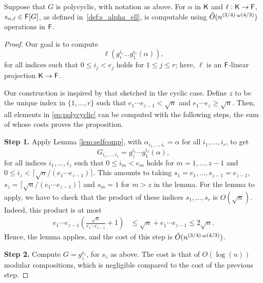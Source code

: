\begin{proposition}\label{prop:polycyclic}
  Suppose that $G$ is polycyclic, with notation as above. For $\alpha$ in
  ${\mathsf{K}}$ and $\ell:{\mathsf{K}}\to{\mathsf{F}}$, $s_{\alpha,\ell} \in {\mathsf{F}}[G]$, as defined
  in~\eqref{def:s_alpha_ell}, is computable using $\tilde{O}(n^{(3/4)\cdot \omega(4/3)})$
  operations in ${\mathsf{F}}$.
\end{proposition}
\begin{proof}
Our goal is to compute
\begin{equation} \label{eq:polycyclic}
  \ell (g_r^{i_r}  \ldots g_1^{i_1}(\alpha)),
\end{equation}
for all indices such that $0 \leq i_j < e_j$ holds for $1 \leq j \leq
r$; here, $\ell$ is an ${\mathsf{F}}$-linear projection ${\mathsf{K}}\to {\mathsf{F}}$.

Our construction is inspired by that sketched in the cyclic case.
Define $z$ to be the unique index in $\{1,\dots,r\}$ such that
$e_1\cdots e_{z-1} < \sqrt{n}$ and $e_1 \cdots e_{z} \geq
\sqrt{n}.$ Then, all elements in \eqref{eq:polycyclic} can be computed
with the following steps, the sum of whose costs proves the
proposition.

\smallskip\noindent \textbf{Step 1.} Apply Lemma \ref{lem:selfcomp},
with $\alpha_{i_1,\dots,i_r} = \alpha$ for all $i_1,\dots,i_r$, to get
$$ G_{i_z,\dots,i_1}=g_z^{i_z} \cdots
g_1^{i_1}(\alpha),$$ for all indices $i_1,\dots,i_z$ such that $0\leq
i_m < e_m$ holds for $m=1,\dots,z-1$ and $0\leq i_z <
\lceil{\sqrt{n}}/(e_1 \cdots e_{z-1})\rceil$.  This amounts to taking
$s_1=e_1,\dots,s_{z-1}=e_{z-1}$, $s_z=\lceil {\sqrt{n}}/(e_1 \cdots
e_{z-1})\rceil$ and $s_m = 1$ for $m > z$ in the lemma.  For the lemma to
apply, we have to check that the product of these indices
$s_1,\dots,s_r$ is $O(\sqrt n)$. 
Indeed, this product is at most 
\begin{align*}
e_1\cdots e_{z-1} \left ( \frac{\sqrt n}{e_1\cdots e_{z-1}} + 1\right )
& \le \sqrt n + e_1\cdots e_{z-1} \le 2 \sqrt n.
\end{align*}
Hence, the lemma applies, and the cost of this step is $\tilde{O}(n^{(3/4)\cdot \omega(4/3)})$.

\smallskip\noindent\textbf{Step 2.} Compute $G=g_z^{s_z}$, for $s_z$
as above. The cost is that of $O(\log(n))$ modular compositions, which
is negligible compared to the cost of the previous step.


\end{proof}
